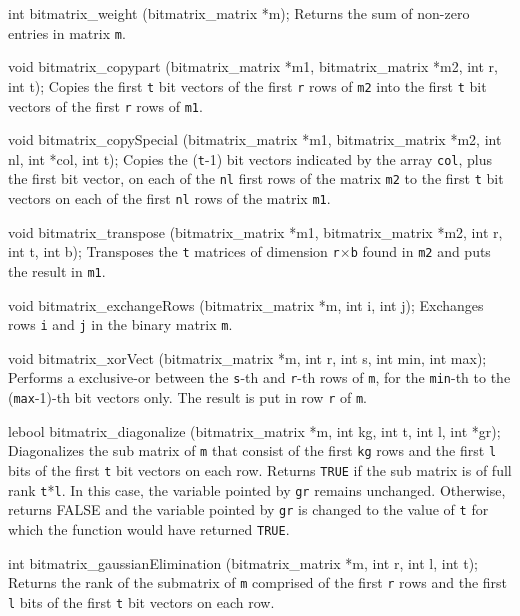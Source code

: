 int bitmatrix_weight (bitmatrix_matrix *m);
\endcode
 \tab
 Returns the sum of non-zero entries in matrix {\tt *m}.
 \endtab
 \code

void bitmatrix_copypart (bitmatrix_matrix *m1, bitmatrix_matrix *m2,
                         int r, int t);
\endcode
 \tab
Copies the first {\tt t} bit vectors of the first {\tt r} rows of
{\tt m2} into the first {\tt t} bit vectors of the first {\tt r} rows of {\tt m1}.
 \endtab
\code

void bitmatrix_copySpecial (bitmatrix_matrix *m1, bitmatrix_matrix *m2,
                            int nl, int *col, int t);
\endcode
 \tab
Copies the ({\tt t}-1) bit vectors indicated by the array {\tt col},
plus the first bit vector, on each of the {\tt nl} first rows of the matrix
{\tt m2} to the first {\tt t} bit vectors
on each of the first {\tt nl} rows of the matrix {\tt m1}.
 \endtab
\code

void bitmatrix_transpose (bitmatrix_matrix *m1, bitmatrix_matrix *m2,
                          int r, int t, int b);
\endcode
 \tab
Transposes the {\tt t} matrices of dimension {\tt r}$\times${\tt b}
found in {\tt m2} and puts the result in {\tt m1}.
 \endtab
\code

void bitmatrix_exchangeRows (bitmatrix_matrix *m, int i, int j);
\endcode
 \tab
Exchanges rows {\tt i} and {\tt j} in the binary matrix {\tt *m}.
 \endtab
\code

void bitmatrix_xorVect (bitmatrix_matrix *m, int r, int s, int min, int max);
\endcode
 \tab
Performs a exclusive-or between the {\tt s}-th and {\tt r}-th rows of {\tt m},
for the {\tt min}-th to the ({\tt max}-1)-th bit vectors only.
The result is put in row {\tt r} of {\tt m}.
 \endtab
\code

lebool bitmatrix_diagonalize (bitmatrix_matrix *m, int kg, int t, int l, int *gr);
\endcode
\tab
Diagonalizes the sub matrix of {\tt m} that consist of the first {\tt kg} rows
and the first {\tt l} bits of the first {\tt t} bit vectors on each row.
Returns {\tt TRUE} if the sub matrix is of full rank {\tt t}*{\tt l}.
In this case, the variable pointed by {\tt gr} remains unchanged.
Otherwise, returns FALSE and the variable pointed by {\tt gr} is changed
to the value of {\tt t} for which the function would have returned {\tt TRUE}.
 \endtab
\code

int bitmatrix_gaussianElimination (bitmatrix_matrix *m, int r, int l, int t);
\endcode
 \tab
Returns the rank of the submatrix of {\tt m} comprised of the first {\tt r} rows
and the first {\tt l} bits of the first {\tt t} bit vectors on each row.
 \endtab
\code

